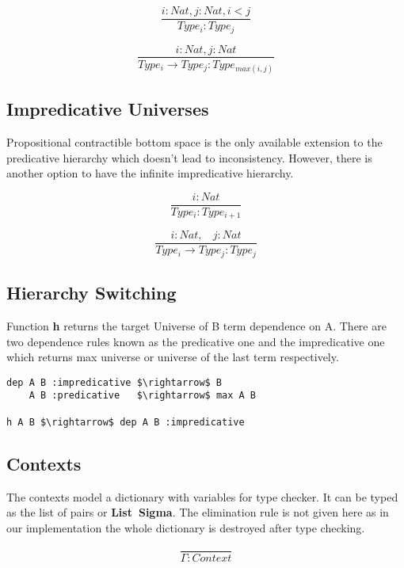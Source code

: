 \documentclass{article}
\begin{document}
\[
\tag{$A_1$}
\dfrac{i: Nat, j: Nat, i < j}{Type_i : Type_j}
\]

\[
\tag{$R_1$}
\dfrac{i : Nat, j : Nat}{Type_i \rightarrow Type_j : Type_{max(i,j)} }
\]

\subsection{Impredicative Universes}
Propositional contractible bottom space is the only available extension to the predicative hierarchy which doesn't lead to inconsistency.
However, there is another option to have the infinite impredicative hierarchy.

\begin{equation}
\tag{$A_2$}
\dfrac
{i: Nat}
{Type_i : Type_{i+1}}
\end{equation}

\begin{equation}
\tag{$R_2$}
\dfrac
{i : Nat,\ \ \ \ j : Nat}
{Type_i \rightarrow Type_{j} : Type_{j}}
\end{equation}

\subsection{Hierarchy Switching}
Function {\bf h} returns the target Universe of B term dependence on A.
There are two dependence rules known as the predicative one and the impredicative one which returns max universe or universe of the last term respectively.

\begin{lstlisting}[mathescape=true]
dep A B :impredicative $\rightarrow$ B
    A B :predicative   $\rightarrow$ max A B

h A B $\rightarrow$ dep A B :impredicative
\end{lstlisting}

\subsection{Contexts}
The contexts model a dictionary with variables for type checker.
It can be typed as the list of pairs or {\bf List\ Sigma}.
The elimination rule is not given here as in our implementation the whole dictionary is destroyed after type checking.

\begin{equation}
\tag{Ctx-formation}
\dfrac
{}
{\Gamma : Context}
\end{equation}
\end{document}
